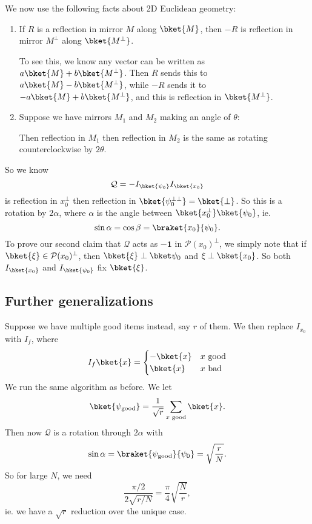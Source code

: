 \documentclass[a4paper]{article}
\begin{document}
We now use the following facts about 2D Euclidean geometry:
\begin{enumerate}
  \item If $R$ is a reflection in mirror $M$ along $\bket{M}$, then $-R$ is reflection in mirror $M^\perp$ along $\bket{M^\perp}$.

    To see this, we know any vector can be written as $a\bket{M} + b \bket{M^\perp}$. Then $R$ sends this to $a \bket{M} - b\bket{M^\perp}$, while $-R$ sends it to $-a \bket{M} + b \bket{M^\perp}$, and this is reflection in $\bket{M^\perp}$.

  \item Suppose we have mirrors $M_1$ and $M_2$ making an angle of $\theta$:
    \begin{center}
    \end{center}
    Then reflection in $M_1$ then reflection in $M_2$ is the same as rotating counterclockwise by $2\theta$.
\end{enumerate}
So we know
\[
  \mathcal{Q} = -I_{\bket{\psi_0}} I_{\bket{x_0}}
\]
is reflection in $x_0^\perp$ then reflection in $\bket{\psi_0^{\perp\perp}} = \bket{\perp}$. So this is a rotation by $2\alpha$, where $\alpha$ is the angle between $\bket{x_0^\perp}\bket{\psi_0}$, ie.
\[
  \sin \alpha = \cos \beta = \braket{x_0}{\psi_0}.
\]
To prove our second claim that $\mathcal{Q}$ acts as $-\mathbf{1}$ in $\mathcal{P}(x_0)^\perp$, we simply note that if $\bket{\xi} \in \mathcal{P}(x_0)^\perp$, then $\bket{\xi} \perp \bket\psi_0$ and $\xi \perp\bket{x_0}$. So both $I_{\bket{x_0}}$ and $I_{\bket{\psi_0}}$ fix $\bket{\xi}$.

\subsection{Further generalizations}
Suppose we have multiple good items instead, say $r$ of them. We then replace $I_{x_0}$ with $I_f$, where
\[
  I_f \bket{x} =
  \begin{cases}
    -\bket{x} & x\text{ good}\\
    \bket{x} & x\text{ bad}
  \end{cases}
\]
We run the same algorithm as before. We let
\[
  \bket{\psi_{\mathrm{good}}} = \frac{1}{\sqrt{r}} \sum_{x\text{ good}} \bket{x}.
\]
Then now $\mathcal{Q}$ is a rotation through $2\alpha$ with
\[
  \sin \alpha = \braket{\psi_{\mathrm{good}}}{\psi_0} = \sqrt{\frac{r}{N}}.
\]
So for large $N$, we need
\[
  \frac{\pi/2}{2\sqrt{r/N}} = \frac{\pi}{4} \sqrt{\frac{N}{r}},
\]
ie. we have a $\sqrt{r}$ reduction over the unique case.
\end{document}
